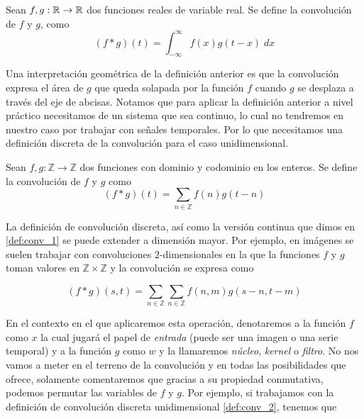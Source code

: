     \begin{definicion}[Convolución]\label{def:conv_1}
    Sean $f,g:\mathbb{R} \to \mathbb{R}$ dos funciones reales de variable real. Se define la convolución de $f$ y $g$, como 
    \begin{equation}
        (f*g)(t) = \int_{-\infty}^{\infty} f(x)g(t-x) \; dx
    \end{equation}
    \end{definicion}
    
    Una interpretación geométrica de la definición anterior es que la convolución expresa el área de $g$ que queda solapada por la función $f$ cuando $g$ se desplaza a través del eje de abcisas. Notamos que para aplicar la definición anterior a nivel práctico necesitamos de un sistema que sea continuo, lo cual no tendremos en nuestro caso por trabajar con señales temporales. Por lo que necesitamos una definición discreta de la convolución para el caso unidimensional.
    
    \begin{definicion}\label{def:conv_2}
    Sean $f,g:\mathbb{Z} \to \mathbb{Z}$ dos funciones con dominio y codominio en los enteros. Se define la convolución de $f$ y $g$ como
    \begin{equation}
        (f*g)(t) = \sum_{n \in \mathbb{Z}} f(n) g(t-n)
    \end{equation}
    \end{definicion}
    
    La definición de convolución discreta, así como la versión continua que dimos en \ref{def:conv_1} se puede extender a dimensión mayor. Por ejemplo, en imágenes se suelen trabajar con convoluciones $2$-dimensionales en la que la funciones $f$ y $g$ toman valores en $\mathbb{Z}\times\mathbb{Z}$ y la convolución se expresa como
    
    \begin{equation}\label{eq:conv_3}
        (f*g)(s,t) = \sum_{n \in \mathbb{Z}} \sum_{n \in \mathbb{Z}} f(n,m)g(s-n,t-m)
    \end{equation}



    En el contexto en el que aplicaremos esta operación, denotaremos a la función $f$ como $x$ la cual jugará el papel de \textit{entrada} (puede ser una imagen o una serie temporal) y a la función $g$ como $w$ y la llamaremos \textit{núcleo}, \textit{kernel} o \textit{filtro}. No nos vamos a meter en el terreno de la convolución y en todas las posibilidades que ofrece, solamente comentaremos que gracias a su propiedad conmutativa, podemos permutar las variables de $f$ y $g$. Por ejemplo, si trabajamos con la definición de convolución discreta unidimensional \ref{def:conv_2}, tenemos que
    
